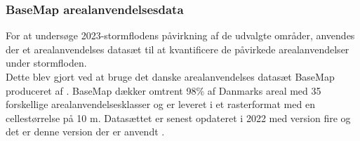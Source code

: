\subsubsection{BaseMap arealanvendelsesdata} \label{Afsnit: Arealanvendelses data}
For at undersøge 2023-stormflodens påvirkning af de udvalgte områder, anvendes der et arealanvendelses datasæt til at kvantificere de påvirkede arealanvendelser under stormfloden. \\
Dette blev gjort ved at bruge det danske arealanvendelses datasæt BaseMap produceret af \cite{Jepsen_levin_2013}. BaseMap dækker omtrent 98\% af Danmarks areal med 35 forskellige arealanvendelsesklasser og er leveret i et rasterformat med en cellestørrelse på 10 m. Datasættet er senest opdateret i 2022 med version fire og det er denne version der er anvendt \citep{levin_basemap04_2022}.\\

